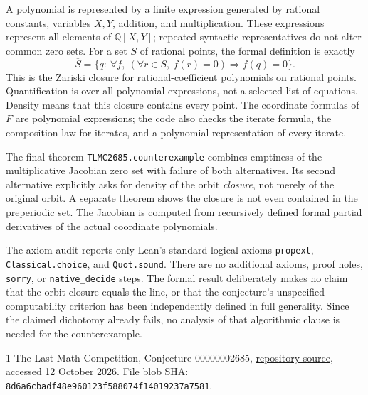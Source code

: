 \documentclass[11pt]{article}
\begin{document}
A polynomial is represented by a finite expression generated by rational
constants, variables $X,Y$, addition, and multiplication. These expressions
represent all elements of $\mathbb Q[X,Y]$; repeated syntactic
representatives do not alter common zero sets. For a set $S$ of rational
points, the formal definition is exactly
\[
 \overline S=\{q:\ \forall f,\ (\forall r\in S,\ f(r)=0)\Rightarrow f(q)=0\}.
\]
This is the Zariski closure for rational-coefficient polynomials on rational
points. Quantification is over all polynomial expressions, not a selected
list of equations. Density means that this closure contains every point.
The coordinate formulas of $F$ are polynomial expressions; the code also
checks the iterate formula, the composition law for iterates, and a
polynomial representation of every iterate.

The final theorem \texttt{TLMC2685.counterexample} combines emptiness of the
multiplicative Jacobian zero set with failure of both alternatives. Its
second alternative explicitly asks for density of the orbit \emph{closure},
not merely of the original orbit. A separate theorem shows the closure is
not even contained in the preperiodic set. The Jacobian is computed from
recursively defined formal partial derivatives of the actual coordinate
polynomials.

The axiom audit reports only Lean's standard logical axioms
\texttt{propext}, \texttt{Classical.choice}, and \texttt{Quot.sound}.
There are no additional axioms, proof holes, \texttt{sorry}, or
\texttt{native\_decide} steps. The formal result deliberately makes no claim
that the orbit closure equals the line, or that the conjecture's unspecified
computability criterion has been independently defined in full generality.
Since the claimed dichotomy already fails, no analysis of that algorithmic
clause is needed for the counterexample.

\begin{thebibliography}{1}
The Last Math Competition, Conjecture 00000002685,
\href{https://github.com/The-Last-Math-Competition/The-Last-Math-Competition/blob/main/conjectures/00000002685.md}{repository source},
accessed 12 October 2026.
File blob SHA: \texttt{8d6a6cbadf48e960123f588074f14019237a7581}.
\end{thebibliography}
\end{document}
